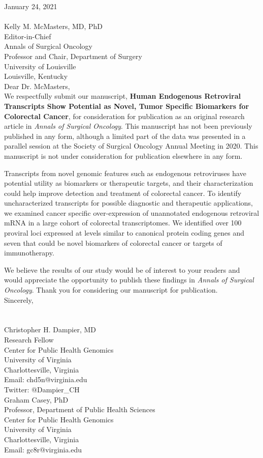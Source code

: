 \documentclass[11pt,letterpaper]{article}  %
\begin{document}
January 24, 2021 \\
\\
Kelly M. McMasters, MD, PhD \\
Editor-in-Chief \\
Annals of Surgical Oncology \\
Professor and Chair, Department of Surgery \\
University of Louisville \\
Louisville, Kentucky \\

Dear Dr. McMasters, \\

We respectfully submit our manuscript, \textbf{Human Endogenous Retroviral Transcripts Show Potential as Novel, Tumor Specific Biomarkers for Colorectal Cancer}, for consideration for publication as an original research article in \emph{Annals of Surgical Oncology}.
This manuscript has not been previously published in any form, although a limited part of the data was presented in a parallel session at the Society of Surgical Oncology Annual Meeting in 2020.
This manuscript is not under consideration for publication elsewhere in any form.

Transcripts from novel genomic features such as endogenous retroviruses have potential utility as biomarkers or therapeutic targets, and their characterization could help improve detection and treatment of colorectal cancer.
To identify uncharacterized transcripts for possible diagnostic and therapeutic applications, we examined cancer specific over-expression of unannotated endogenous retroviral mRNA in a large cohort of colorectal transcriptomes.
We identified over 100 proviral loci expressed at levels similar to canonical protein coding genes and seven that could be novel biomarkers of colorectal cancer or targets of immunotherapy.

We believe the results of our study would be of interest to your readers and would appreciate the opportunity to publish these findings in \emph{Annals of Surgical Oncology}. Thank you for considering our manuscript for publication. \\

Sincerely,\\
\\
\\
Christopher H. Dampier, MD \\
Research Fellow \\
Center for Public Health Genomics \\
University of Virginia \\
Charlottesville, Virginia \\
Email: chd5n@virginia.edu \\
Twitter: @Dampier\_CH \\

Graham Casey, PhD \\
Professor, Department of Public Health Sciences \\
Center for Public Health Genomics \\
University of Virginia \\
Charlottesville, Virginia \\
Email: gc8r@virginia.edu
\end{document}
